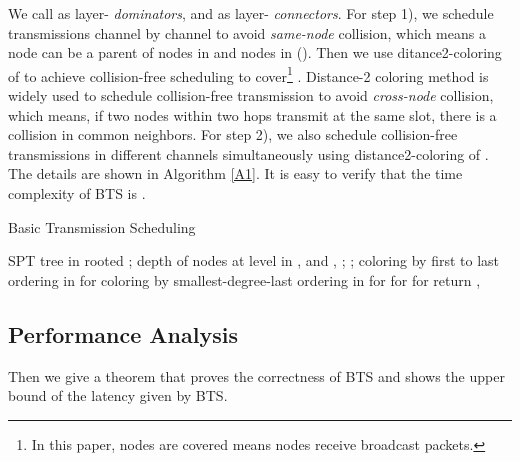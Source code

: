 \documentclass[10pt, conference]{IEEEtran}
\begin{document}
We call  as layer-
\emph{dominators}, and  as
layer- \emph{connectors}. For step 1), we schedule
transmissions channel by channel to avoid \emph{same-node}
collision, which means a node can be a parent of nodes in
 and nodes in  (). Then we
use ditance2-coloring of  to achieve collision-free
scheduling to cover\footnote{In this paper, nodes are covered
means nodes receive broadcast packets.} . Distance-2
coloring method is widely used to schedule collision-free
transmission to avoid \emph{cross-node} collision, which means, if
two nodes within two hops transmit at the same slot, there is a
collision in common neighbors. For step 2), we also schedule
collision-free transmissions in different channels
simultaneously using distance2-coloring of . The
details are shown in Algorithm \ref{A1}. It is easy to verify
that the time complexity of BTS is .













\begin{algorithm}[tbp] \label{A1}
\caption{Basic Transmission Scheduling}
\KwIn{, , }
\KwOut{, }
 SPT tree in  rooted ;  depth of \;
 nodes at level  in , \;
 and , \;
{
 {
    ; \;
    {
        \If{}
        {
            ;
        }
    }
     coloring by first to last ordering in  for \;
     coloring by smallest-degree-last ordering in  for \;
 }
}
\;
{
 {
      for \;
    \;
 }
 {
      for \;
 }
 \;
}
return , \;
\end{algorithm}


\subsection{Performance Analysis}

Then we give a theorem that proves the correctness of BTS and
shows the upper bound of the latency given by BTS.
\end{document}
